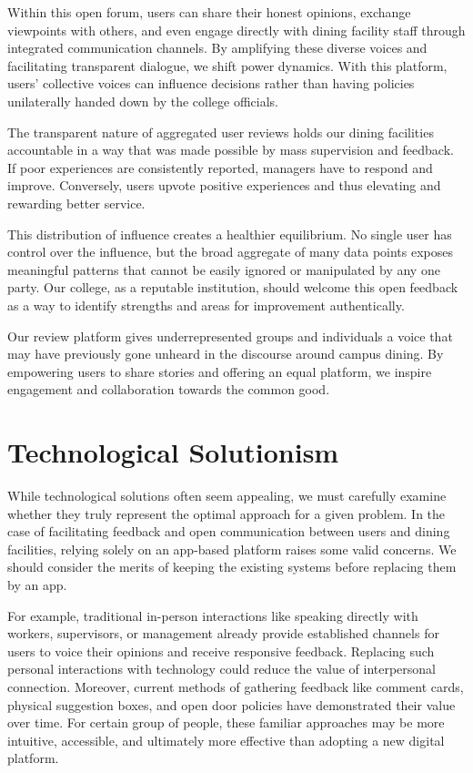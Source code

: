 \documentclass[10pt,twocolumn]{article}
\begin{document}
Within this open forum, users can share their honest opinions, exchange viewpoints with others, and even engage directly with dining facility staff through integrated communication channels. By amplifying these diverse voices and facilitating transparent dialogue, we shift power dynamics. With this platform, users' collective voices can influence decisions rather than having policies unilaterally handed down by the college officials.

The transparent nature of aggregated user reviews holds our dining facilities accountable in a way that was made possible by mass supervision and feedback. If poor experiences are consistently reported, managers have to respond and improve. Conversely, users upvote positive experiences and thus elevating and rewarding better service.

This distribution of influence creates a healthier equilibrium. No single user has control over the influence, but the broad aggregate of many data points exposes meaningful patterns that cannot be easily ignored or manipulated by any one party.  Our college, as a reputable institution, should welcome this open feedback as a way to identify strengths and areas for improvement authentically.

Our review platform gives underrepresented groups and individuals a voice that may have previously gone unheard in the discourse around campus dining. By empowering users to share stories and offering an equal platform, we inspire engagement and collaboration towards the common good.

\section{Technological Solutionism}

While technological solutions often seem appealing, we must carefully examine whether they truly represent the optimal approach for a given problem. In the case of facilitating feedback and open communication between users and dining facilities, relying solely on an app-based platform raises some valid concerns. We should consider the merits of keeping the existing systems before replacing them by an app.

For example, traditional in-person interactions like speaking directly with workers, supervisors, or management already provide established channels for users to voice their opinions and receive responsive feedback. Replacing such personal interactions with technology could reduce the value of interpersonal connection. Moreover, current methods of gathering feedback like comment cards, physical suggestion boxes, and open door policies have demonstrated their value over time. For certain group of people, these familiar approaches may be more intuitive, accessible, and ultimately more effective than adopting a new digital platform.
\end{document}
